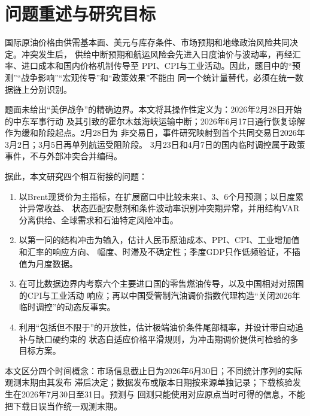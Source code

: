 \section{问题重述与研究目标}

国际原油价格由供需基本面、美元与库存条件、市场预期和地缘政治风险共同决定。冲突发生后，
供给中断预期和航运风险会先进入日度油价与波动率，再经汇率、进口成本和国内价格机制传导至
PPI、CPI与工业活动。因此，题目中的“预测”“战争影响”“宏观传导”和“政策效果”不能由
同一个统计量替代，必须在统一数据链上分别识别。

题面未给出“美伊战争”的精确边界。本文将其操作性定义为：2026年2月28日开始的中东军事行动
及其引致的霍尔木兹海峡运输中断；2026年6月17日通行恢复谅解作为缓和阶段起点。2月28日为
非交易日，事件研究映射到首个共同交易日2026年3月2日；3月5日再单列航运受阻阶段。
3月23日和4月7日的国内临时调控属于政策事件，不与外部冲突合并编码。

据此，本文研究四个相互衔接的问题：

\begin{enumerate}
  \item 以Brent现货价为主指标，在扩展窗口中比较未来1、3、6个月预测；以日度累计异常收益、
  状态匹配安慰剂和条件波动率识别冲突期异常，并用结构VAR分离供给、全球需求和石油特定风险冲击。
  \item 以第一问的结构冲击为输入，估计人民币原油成本、PPI、CPI、工业增加值和汇率的响应方向、
  幅度、时滞及不确定性；季度GDP只作低频验证，不插值为月度数据。
  \item 在可比数据边界内考察六个主要进口国的零售燃油传导，以及中国相对对照国的CPI与工业活动
  响应；再以中国受管制汽油调价指数代理构造“关闭2026年临时调控”的动态反事实。
  \item 利用“包括但不限于”的开放性，估计极端油价条件尾部概率，并设计带自动追补与缺口硬约束的
  状态自适应价格平滑规则，为冲击期调价提供可检验的多目标方案。
\end{enumerate}

本文区分四个时间概念：市场信息截止日为2026年6月30日；不同统计序列的实际观测末期由其发布
滞后决定；数据发布或版本日期按来源单独记录；下载核验发生在2026年7月30日至31日。预测与
回测只能使用对应原点当时可得的信息，不能把下载日误当作统一观测末期。
